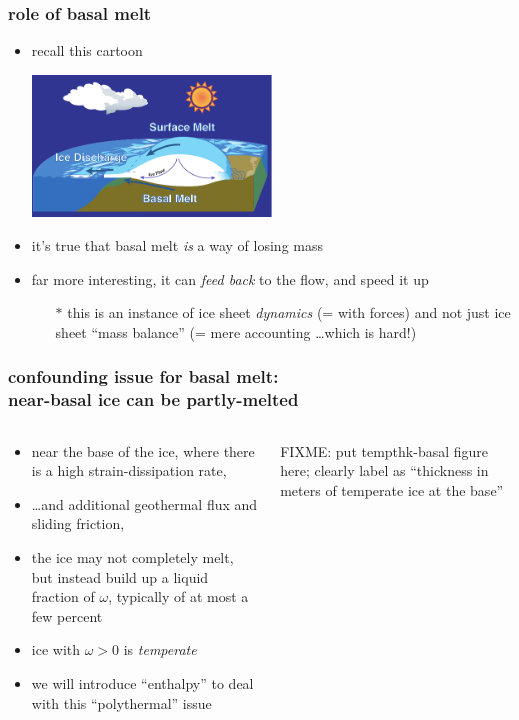 \documentclass{beamer}
\begin{document}
\begin{frame}
  \frametitle{role of basal melt}
\small
\begin{itemize}
\item recall this cartoon
  \begin{center}
    \includegraphics[width=0.5\textwidth]{ice-sheet-cartoon}\\
  \end{center}
\item it's true that basal melt \emph{is} a way of losing mass
\item far more interesting, it can \emph{feed back} to the flow, and speed it up
  \begin{itemize}
  \item[$\ast$] this is an instance of ice sheet \emph{dynamics} (= with forces) and not just ice sheet ``mass balance'' (= mere accounting \dots which is hard!)
  \end{itemize}
\end{itemize}
\end{frame}


\begin{frame}
  \frametitle{confounding issue for basal melt: \\ near-basal ice can be partly-melted}
\begin{columns}
\begin{column}{0.6\textwidth}
  \begin{itemize}
  \item near the base of the ice, where there is a high strain-dissipation rate,
  \item \dots and additional geothermal flux and sliding friction,
  \item the ice may not completely melt, but instead build up a liquid fraction of $\omega$, typically of at most a few percent
  \item ice with $\omega > 0$ is \emph{temperate}
  \item we will introduce ``enthalpy'' to deal with this ``polythermal'' issue
  \end{itemize}
\end{column}
\begin{column}{0.4\textwidth}
FIXME: put tempthk-basal figure here; clearly label as ``thickness in meters of temperate ice at the base''
\end{column}
\end{columns}
\end{frame}
\end{document}
